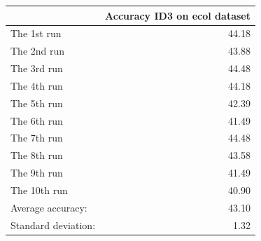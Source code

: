 \begin{tabular}{lr}
\toprule
{} &  Accuracy ID3 on ecol dataset \\
\midrule
The 1st run         &                         44.18 \\
The 2nd run         &                         43.88 \\
The 3rd run         &                         44.48 \\
The 4th run         &                         44.18 \\
The 5th run         &                         42.39 \\
The 6th run         &                         41.49 \\
The 7th run         &                         44.48 \\
The 8th run         &                         43.58 \\
The 9th run         &                         41.49 \\
The 10th run        &                         40.90 \\
Average accuracy:   &                         43.10 \\
Standard deviation: &                          1.32 \\
\bottomrule
\end{tabular}
